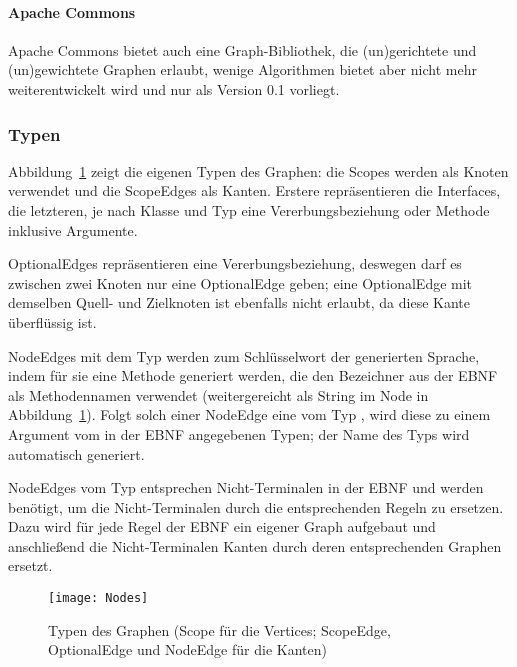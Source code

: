 \documentclass[../InterneDSLs.tex]{subfiles}
\begin{document}
\paragraph{Apache Commons}
Apache Commons bietet auch eine Graph-Bibliothek, die (un)gerichtete und (un)gewichtete Graphen erlaubt, wenige Algorithmen bietet aber nicht mehr weiterentwickelt wird und nur als Version 0.1 vorliegt.

\subsubsection{Typen}
Abbildung~\ref{FIG:GraphTypes} zeigt die eigenen Typen des Graphen: die Scopes werden als Knoten verwendet und die ScopeEdges als Kanten. Erstere repräsentieren die Interfaces, die letzteren, je nach Klasse und Typ eine Vererbungsbeziehung oder Methode inklusive Argumente.

OptionalEdges repräsentieren eine Vererbungsbeziehung, deswegen darf es zwischen zwei Knoten nur eine OptionalEdge geben; eine OptionalEdge mit demselben Quell- und Zielknoten ist ebenfalls nicht erlaubt, da diese Kante überflüssig ist.

NodeEdges mit dem Typ  werden zum Schlüsselwort der generierten Sprache, indem für sie eine Methode generiert werden, die den Bezeichner aus der EBNF als Methodennamen verwendet (weitergereicht als String im Node in Abbildung~\ref{FIG:GraphTypes}). Folgt solch einer NodeEdge eine vom Typ , wird diese zu einem Argument vom in der EBNF angegebenen Typen; der Name des Typs wird automatisch generiert.

NodeEdges vom Typ  entsprechen Nicht-Terminalen in der EBNF und werden benötigt, um die Nicht-Terminalen durch die entsprechenden Regeln zu ersetzen. Dazu wird für jede Regel der EBNF ein eigener Graph aufgebaut und anschließend die Nicht-Terminalen Kanten durch deren entsprechenden Graphen ersetzt.
\begin{figure}[ht]
\centering
\texttt{[image: Nodes]}
\caption{Typen des Graphen (Scope für die Vertices; ScopeEdge, OptionalEdge und NodeEdge für die Kanten)}
\label{FIG:GraphTypes}
\end{figure}
\end{document}
